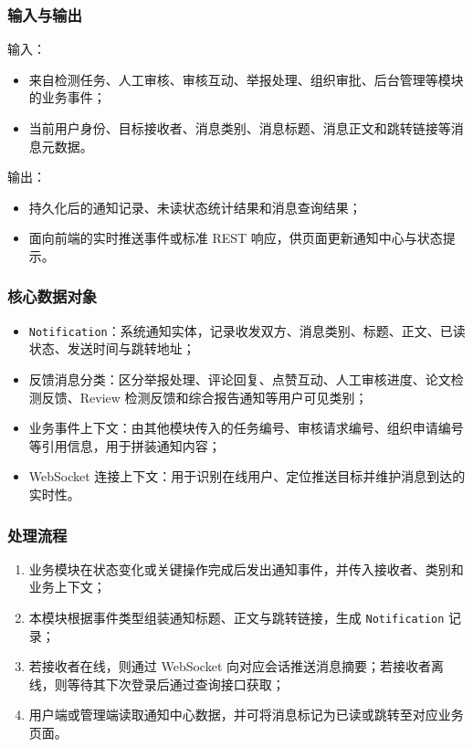 \subsubsection{输入与输出}
输入：
\begin{itemize}[leftmargin=2em]
    \item 来自检测任务、人工审核、审核互动、举报处理、组织审批、后台管理等模块的业务事件；
    \item 当前用户身份、目标接收者、消息类别、消息标题、消息正文和跳转链接等消息元数据。
\end{itemize}

输出：
\begin{itemize}[leftmargin=2em]
    \item 持久化后的通知记录、未读状态统计结果和消息查询结果；
    \item 面向前端的实时推送事件或标准 REST 响应，供页面更新通知中心与状态提示。
\end{itemize}

\subsubsection{核心数据对象}
\begin{itemize}[leftmargin=2em]
    \item \texttt{Notification}：系统通知实体，记录收发双方、消息类别、标题、正文、已读状态、发送时间与跳转地址；
    \item 反馈消息分类：区分举报处理、评论回复、点赞互动、人工审核进度、论文检测反馈、Review 检测反馈和综合报告通知等用户可见类别；
    \item 业务事件上下文：由其他模块传入的任务编号、审核请求编号、组织申请编号等引用信息，用于拼装通知内容；
    \item WebSocket 连接上下文：用于识别在线用户、定位推送目标并维护消息到达的实时性。
\end{itemize}

\subsubsection{处理流程}
\begin{enumerate}[leftmargin=2em]
    \item 业务模块在状态变化或关键操作完成后发出通知事件，并传入接收者、类别和业务上下文；
    \item 本模块根据事件类型组装通知标题、正文与跳转链接，生成 \texttt{Notification} 记录；
    \item 若接收者在线，则通过 WebSocket 向对应会话推送消息摘要；若接收者离线，则等待其下次登录后通过查询接口获取；
    \item 用户端或管理端读取通知中心数据，并可将消息标记为已读或跳转至对应业务页面。
\end{enumerate}

